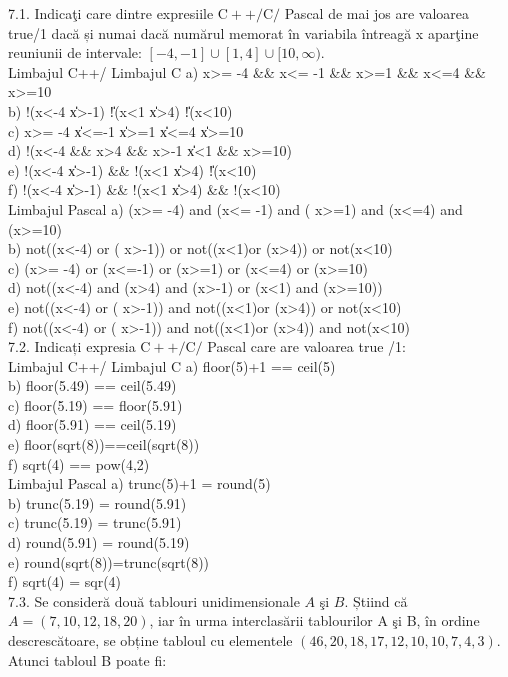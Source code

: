 7.1. Indicaţi care dintre expresiile $\mathrm{C}++/ \mathrm{C} /$ Pascal de mai jos are valoarea true/1 dacă și numai dacă numărul memorat în variabila întreagă x aparţine reuniunii de intervale:
$[-4,-1] \cup[1,4] \cup[10, \infty)$.
\\
Limbajul C++/ Limbajul C
a) x>= -4 \&\& x<= -1 \&\& x>=1 \&\& x<=4 \&\& x>=10
\\
b) !(x<-4 \|\| x>-1) \|\| !(x<1 \|\| x>4) \|\| !(x<10)
\\
c) x>= -4 \|\| x<=-1 \|\| x>=1 \|\| x<=4 \|\| x>=10
\\
d) !(x<-4 \&\& x>4 \&\& x>-1 \|\| x<1 \&\& x>=10)
\\
e) !(x<-4 \|\| x>-1) \&\& !(x<1 \|\| x>4) \|\| !(x<10)
\\
f) !(x<-4 \|\| x>-1) \&\& !(x<1 \|\| x>4) \&\& !(x<10)
\\
Limbajul Pascal
a) (x>= -4) and (x<= -1) and ( x>=1) and (x<=4) and (x>=10)
\\
b) not((x<-4) or ( x>-1)) or not((x<1)or (x>4)) or not(x<10)
\\
c) (x>= -4) or (x<=-1) or (x>=1) or (x<=4) or (x>=10)
\\
d) not((x<-4) and (x>4) and (x>-1) or (x<1) and (x>=10))
\\
e) not((x<-4) or ( x>-1)) and not((x<1)or (x>4)) or not(x<10)
\\
f) not((x<-4) or ( x>-1)) and not((x<1)or (x>4)) and not(x<10)
\\
7.2. Indicați expresia $\mathrm{C}++/ \mathrm{C} /$ Pascal care are valoarea true /1:
\\
Limbajul C++/ Limbajul C
a) floor(5)+1 == ceil(5)
\\
b) floor(5.49) == ceil(5.49)
\\
c) floor(5.19) == floor(5.91)
\\
d) floor(5.91) == ceil(5.19)
\\
e) floor(sqrt(8))==ceil(sqrt(8))
\\
f) sqrt(4) == pow(4,2)
\\
Limbajul Pascal
a) trunc(5)+1 = round(5)
\\
b) trunc(5.19) = round(5.91)
\\
c) trunc(5.19) = trunc(5.91)
\\  
d) round(5.91) = round(5.19)
\\
e) round(sqrt(8))=trunc(sqrt(8))
\\
f) sqrt(4) = sqr(4)
\\
7.3. Se consideră două tablouri unidimensionale $A$ şi $B$. Știind că $A=(7,10,12,18,20)$, iar în urma interclasării tablourilor A şi B, în ordine descrescătoare, se obține tabloul cu elementele $(46,20,18,17,12,10,10,7,4,3)$. Atunci tabloul B poate fi:
